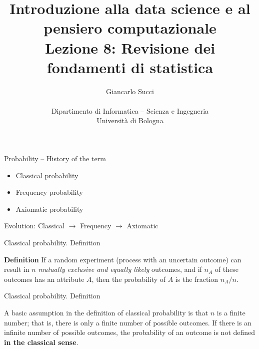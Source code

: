 \documentclass{beamer}
\title[L02]{Introduzione alla data science e al pensiero computazionale\\
Lezione 8: Revisione dei fondamenti di statistica} %
\author[{\tiny Giancarlo Succi }]{Giancarlo Succi\\\\ Dipartimento di Informatica -- Scienza e Ingegneria\\Universit\`{a} di Bologna\\
\bftt{g.succi@unibo.it}
} %
\institute[unibo] %
\date{} %
\begin{document}
\begin{frame}
\titlepage %

\end{frame}





\begin{frame}
{\centerline{Probability -- History of the term}}
\begin{itemize}
\item Classical probability 
\item Frequency probability 
\item Axiomatic probability
\end{itemize}

\begin{center}
Evolution: Classical $\to$  Frequency  $\to$  Axiomatic
\end{center}
\end{frame}



\begin{frame}
{\centerline{Classical probability. Definition }}
\Large{\textbf{Definition} If a random experiment (process with an uncertain outcome) can result in $n$ \textit{ mutually exclusive and equally likely} outcomes, and if $n_A$ of these outcomes has an attribute $A$, then the probability of $A$ is the fraction $n_A/n$.}

\end{frame}



\begin{frame}
{\centerline{Classical probability. Definition }}

\Large{A basic assumption in the definition of classical probability is that $n$ is a finite number; that is, there is only a finite number of possible outcomes. If there is an infinite number of possible outcomes, the probability of an outcome is not defined \textbf{in the classical sense}.}

\end{frame}
\end{document}
